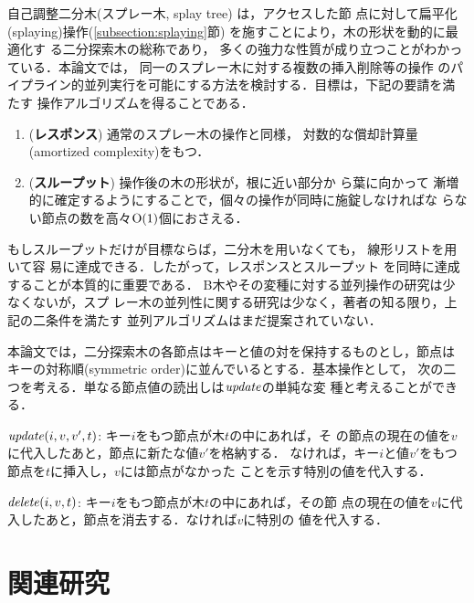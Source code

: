 \documentclass[T]{compsoft}
\begin{document}
自己調整二分木(スプレー木, splay tree) \cite{ST85}は，アクセスした節
点に対して扁平化(splaying)操作(\ref{subsection:splaying}節)
を施すことにより，木の形状を動的に最適化す
る二分探索木の総称であり，
%
%
多くの強力な性質が成り立つことがわかっている．本論文では，
同一のスプレー木に対する複数の挿入削除等の操作
のパイプライン的並列実行を可能にする方法を検討する．目標は，下記の要請を満たす
操作アルゴリズムを得ることである．
%
\begin{enumerate}
\item ({\bf レスポンス}) 通常のスプレー木の操作と同様，
対数的な償却計算量(amortized complexity)\cite{T85}をもつ．

\item ({\bf スループット}) 操作後の木の形状が，根に近い部分か
ら葉に向かって
漸増的に確定するようにすることで，個々の操作が同時に施錠しなければな
らない節点の数を高々${\rm O}(1)$個におさえる．
\end{enumerate}
%
もしスループットだけが目標ならば，二分木を用いなくても，
線形リストを用いて容
易に達成できる．したがって，レスポンスとスループット
を同時に達成することが本質的に重要である．
%
B木やその変種に対する並列操作の研究は少なくない\cite{LS86}が，スプ
レー木の並列性に関する研究は少なく，著者の知る限り，上記の二条件を満たす
並列アルゴリズムはまだ提案されていない．

本論文では，二分探索木の各節点はキーと値の対を保持するものとし，節点は
キーの対称順(symmetric order)に並んでいるとする．基本操作として，
次の二つを考える．単なる節点値の読出しは${\it update\/}$の単純な変
種と考えることができる．

\begin{description}
\item{${\it update}(i,v,v',t)$:} キー$i$をもつ節点が木$t$の中にあれば，そ
の節点の現在の値を$v$に代入したあと，節点に新たな値$v'$を格納する．
なければ，キー$i$と値$v'$をもつ節点を$t$に挿入し，$v$には節点がなかった
ことを示す特別の値を代入する．

\item{${\it delete}(i,v,t)$:} キー$i$をもつ節点が木$t$の中にあれば，その節
点の現在の値を$v$に代入したあと，節点を消去する．なければ$v$に特別の
値を代入する．
\end{description}


\section{関連研究}
\end{document}

